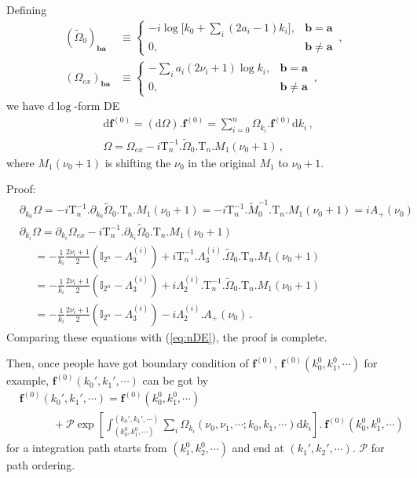 \documentclass[a4paper,11pt]{article}
\newcommand{\nn}{\nonumber}
\newcommand{\nd}{\mathrm{d}}
\def\eqref#1{(\ref{#1})}
\begin{document}
Defining
\begin{align}
\left( \tilde{\Omega}_0 \right)_{\bm{b}\bm{a}} & \equiv \begin{cases} - i \log \Big[ k_0+\sum_i (2a_i-1)k_i\Big] , & \bm{b}=\bm{a} \\
0, & \bm{b}\neq \bm{a} 
\end{cases} \, , \nn\\
\left( \Omega_{ex} \right)_{\bm{b}\bm{a}} & \equiv \begin{cases} - \sum_i a_i(2\nu_i+1) \log k_i , & \bm{b}=\bm{a} \\
0, & \bm{b}\neq \bm{a} 
\end{cases} \, ,
\end{align}
we have $\nd \log$-form DE 
\begin{align}
&\nd \bm{f}^{(0)} = (\nd \Omega) . \bm{f}^{(0)} = \sum_{i=0}^{n} \Omega_{k_i} . \bm{f}^{(0)} \nd k_i  \, ,\nn\\
&\Omega =  \Omega_{ex} - i \text{T}_n^{-1}.  \tilde{\Omega}_0.\text{T}_n.M_1(\nu_0+1) \, ,  \label{eq:ndlogDE}
\end{align}
where $M_1(\nu_0+1)$ is shifting the $\nu_0$ in the original $M_1$ to $\nu_0+1$.

Proof:
\begin{align}
& \partial_{k_0} \Omega =   -i \text{T}_n^{-1}.  \partial_{k_0}\tilde{\Omega}_0.\text{T}_n.M_1(\nu_0+1) =  -i \text{T}_n^{-1}.  \tilde{M}_0^{-1} .\text{T}_n.M_1(\nu_0+1) = i A_+(\nu_0) \nn\\
& \partial_{k_i} \Omega = \partial_{k_i}\Omega_{ex} - i \text{T}_n^{-1}.  \partial_{k_i}\tilde{\Omega}_0.\text{T}_n.M_1(\nu_0+1) \nn\\
&~~~~~~=- \frac{1}{ k_i}\frac{2\nu_i+1}{2}(\mathbb{I}_{2^n} - \Lambda_3^{(i)}) + i \text{T}_n^{-1}.  \Lambda_3^{(i)}.\tilde{\Omega}_0.\text{T}_n.M_1(\nu_0+1) \nn\\
&~~~~~~=- \frac{1}{ k_i}\frac{2\nu_i+1}{2}(\mathbb{I}_{2^n} - \Lambda_3^{(i)}) + i  \Lambda_2^{(i)}. \text{T}_n^{-1}.  \tilde{\Omega}_0.\text{T}_n.M_1(\nu_0+1)   \nn\\
&~~~~~~=- \frac{1}{ k_i}\frac{2\nu_i+1}{2}(\mathbb{I}_{2^n} - \Lambda_3^{(i)}) -i  \Lambda_2^{(i)}.A_+(\nu_0)  \, .
\end{align}
Comparing these equations with \eqref{eq:nDE}, the proof is complete.

Then, once people have got boundary condition of $\bm{f}^{(0)}$, $\bm{f}^{(0)}(k_0^{0},k_1^0,\cdots)$ for example, $\bm{f}^{(0)}(k_0',k_1',\cdots)$ can be got by
\begin{align}
&\bm{f}^{(0)}(k_0',k_1',\cdots) = \bm{f}^{(0)}(k_0^{0},k_1^0,\cdots) \nn\\
 & \quad \quad \quad + \mathcal{P} \exp\left[\int_{(k_0^{0},k_1^0,\cdots)}^{(k_0',k_1',\cdots)}  \sum_i \Omega_{k_i}(\nu_0,\nu_1,\cdots;k_0,k_1,\cdots) \nd k_i  \right]  .\ \bm{f}^{(0)}(k_0^{0},k_1^0,\cdots)
\end{align}
for a integration path starts from $(k_1^{0},k_2^0,\cdots)$ and end at $(k_1',k_2',\cdots)$. $\mathcal{P}$ for path ordering.
\end{document}

